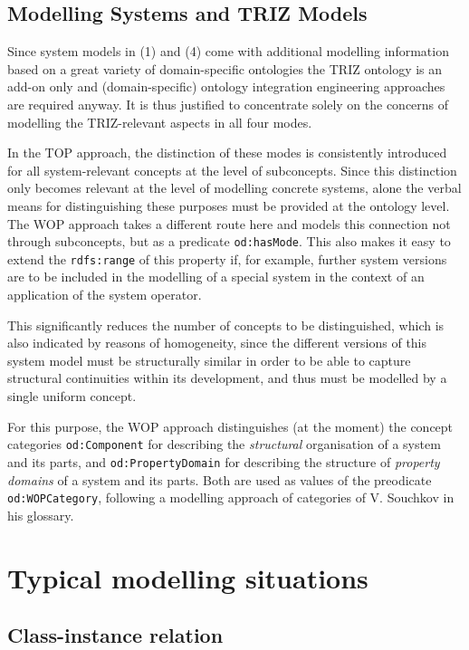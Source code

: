 \documentclass[11pt,a4paper]{article}
\begin{document}
\subsection{Modelling Systems and TRIZ Models}

Since system models in (1) and (4) come with additional modelling information
based on a great variety of domain-specific ontologies the TRIZ ontology is an
add-on only and (domain-specific) ontology integration engineering approaches
are required anyway. It is thus justified to concentrate solely on the
concerns of modelling the TRIZ-relevant aspects in all four modes.

In the TOP approach, the distinction of these modes is consistently introduced
for all system-relevant concepts at the level of subconcepts. Since this
distinction only becomes relevant at the level of modelling concrete systems,
alone the verbal means for distinguishing these purposes must be provided at
the ontology level. The WOP approach takes a different route here and models
this connection not through subconcepts, but as a predicate
\texttt{od:hasMode}.  This also makes it easy to extend the
\texttt{rdfs:range} of this property if, for example, further system versions
are to be included in the modelling of a special system in the context of an
application of the system operator.

This significantly reduces the number of concepts to be distinguished, which
is also indicated by reasons of homogeneity, since the different versions of
this system model must be structurally similar in order to be able to capture
structural continuities within its development, and thus must be modelled by a
single uniform concept.

For this purpose, the WOP approach distinguishes (at the moment) the concept
categories \texttt{od:Component} for describing the \emph{structural}
organisation of a system and its parts, and \texttt{od:PropertyDomain} for
describing the structure of \emph{property domains} of a system and its
parts.  Both are used as values of the preodicate \texttt{od:WOPCategory},
following a modelling approach of categories of V. Souchkov in his glossary. 

\section{Typical modelling situations}

\subsection{Class-instance relation}
\end{document}
